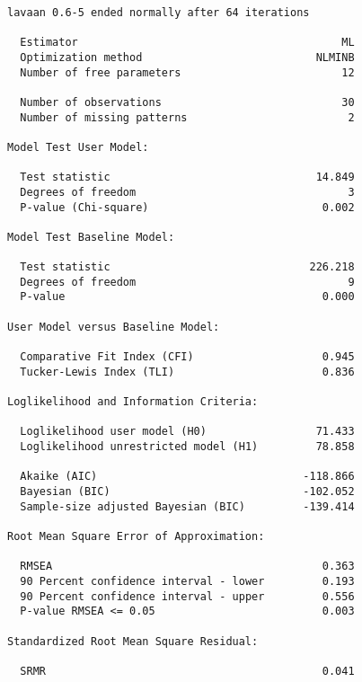 \begin{verbatim}
lavaan 0.6-5 ended normally after 64 iterations

  Estimator                                         ML
  Optimization method                           NLMINB
  Number of free parameters                         12
                                                      
  Number of observations                            30
  Number of missing patterns                         2
                                                      
Model Test User Model:
                                                      
  Test statistic                                14.849
  Degrees of freedom                                 3
  P-value (Chi-square)                           0.002

Model Test Baseline Model:

  Test statistic                               226.218
  Degrees of freedom                                 9
  P-value                                        0.000

User Model versus Baseline Model:

  Comparative Fit Index (CFI)                    0.945
  Tucker-Lewis Index (TLI)                       0.836

Loglikelihood and Information Criteria:

  Loglikelihood user model (H0)                 71.433
  Loglikelihood unrestricted model (H1)         78.858
                                                      
  Akaike (AIC)                                -118.866
  Bayesian (BIC)                              -102.052
  Sample-size adjusted Bayesian (BIC)         -139.414

Root Mean Square Error of Approximation:

  RMSEA                                          0.363
  90 Percent confidence interval - lower         0.193
  90 Percent confidence interval - upper         0.556
  P-value RMSEA <= 0.05                          0.003

Standardized Root Mean Square Residual:

  SRMR                                           0.041
\end{verbatim}
